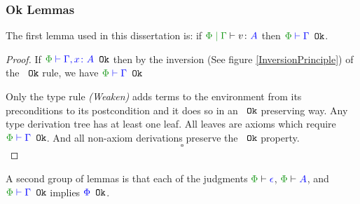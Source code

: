 \documentclass{Report}
\begin{document}
\subsubsection{Ok Lemmas}

\begin{lemma}
    The first lemma used in this dissertation is: if $\gpetyperelation{v}{A}$ then $\oke{\P}{\G}$.
\end{lemma}
\begin{proof}
    If $\oke{\P}{\gax}$ then by the inversion (See figure \ref{InversionPrinciple}) of the ${\color{blue} } \texttt{ Ok}$ rule, we have $\oke{\P}{\G}$ 

    Only the type rule \textit{(Weaken)} adds terms to the environment from its preconditions to its postcondition and it does so in an ${\color{blue} } \texttt{ Ok}$ preserving way. Any type derivation tree has at least one leaf. All leaves are axioms which require $\oke{\P}{\G}$. And all non-axiom derivations preserve the ${\color{blue} } \texttt{ Ok}$ property.
    $$\square$$
\end{proof}

\begin{lemma}
    A second group of lemmas is that each of the judgments  $\wellformed{\P}{\e}$, $\wellformed{\P}{A}$, and $\oke{\P}{\G}$ implies ${\color{blue} \Phi} \texttt{ Ok}$.
\end{lemma}
\end{document}
